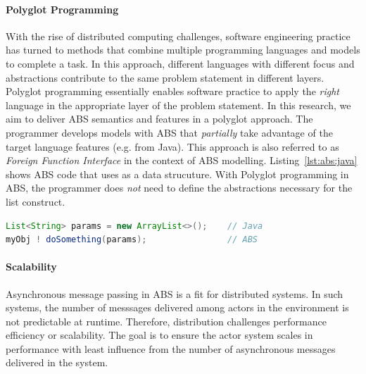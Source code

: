 \paragraph{Polyglot Programming}
With the rise of distributed computing challenges, software engineering practice has turned to methods that combine multiple programming languages and models to complete a task. 
In this approach, different languages with different focus and abstractions contribute to the same problem statement in different layers. 
Polyglot programming essentially enables software practice to apply the \emph{right} language in the appropriate layer of the problem statement. 
In this research, we aim to deliver ABS semantics and features in a polyglot approach. 
The programmer develops models with ABS that \emph{partially} take advantage of the target language features (e.g. from Java).
This approach is also referred to as \emph{Foreign Function Interface} in the context of ABS modelling.
Listing~\ref{lst:abs:java} shows ABS code that uses  as a data strucuture.
With Polyglot programming in ABS, the programmer does \emph{not} need to define the abstractions necessary for the list construct. 

\begin{lstlisting}[float=h,language=Java,caption=Using Java in ABS,label=lst:abs:java]
List<String> params = new ArrayList<>();    // Java
myObj ! doSomething(params);                // ABS
\end{lstlisting}

\paragraph{Scalability} 
Asynchronous message passing in ABS is a fit for distributed systems.
In such systems, the number of messsages delivered among actors in the 
environment is not predictable at runtime.
Therefore, distribution challenges performance efficiency or scalability.
The goal is to ensure the actor system scales in performance with least 
influence from the number of asynchronous messages delivered in the system.

